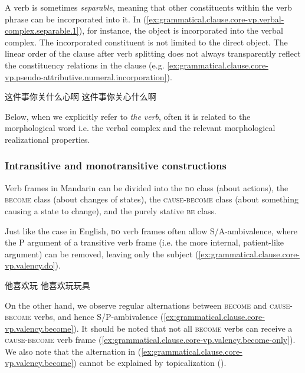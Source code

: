 \documentclass[UTF8, a4paper, oneside, scheme=plain, 12pt]{ctexrep}
\newcommand*{\term}[1]{\emph{#1}}
\newcommand*{\category}[1]{\textsc{#1}}
\begin{document}
A verb is sometimes \emph{separable},
meaning that other constituents within the verb phrase can be incorporated into it.
In (\ref{ex:grammatical.clause.core-vp.verbal-complex.separable.1}),
for instance, the object is incorporated into the verbal complex.
The incorporated constituent is not limited to the direct object.
The linear order of the clause after verb splitting
does not always transparently reflect the constituency relations in the clause
(e.g. \ref{ex:grammatical.clause.core-vp.pseudo-attributive.numeral.incorporation}).

\begin{exe}
    \ex\label{ex:grammatical.clause.core-vp.verbal-complex.separable.1} \begin{xlist}
        \ex 这件事你关什么心啊
        \ex 这件事你关心什么啊
    \end{xlist}
\end{exe}
 
Below, when we explicitly refer to \term{the verb},
often it is related to the morphological word i.e. the verbal complex
and the relevant morphological realizational properties.

\subsubsection{Intransitive and monotransitive constructions}\label{sec:grammatical.clause.core-vp.transitivity}

Verb frames in Mandarin can be divided into the \category{do} class (about actions),
the \category{become} class (about changes of states),
the \category{cause}-\category{become} class (about something causing a state to change),
and the purely stative \category{be} class.

Just like the case in English, \category{do} verb frames often allow S/A-ambivalence,
where the P argument of a transitive verb frame (i.e. the more internal, patient-like argument) can be removed, leaving only the subject (\ref{ex:grammatical.clause.core-vp.valency.do}).

\begin{exe}
    \ex\label{ex:grammatical.clause.core-vp.valency.do} \begin{xlist}
        \ex 他喜欢玩
        \ex 他喜欢玩玩具
    \end{xlist}
\end{exe}

On the other hand, we observe regular alternations between \category{become} and \category{cause}-\category{become} verbs,
and hence S/P-ambivalence (\ref{ex:grammatical.clause.core-vp.valency.become}).
It should be noted that not all \category{become} verbs can receive a \category{cause}-\category{become} verb frame (\ref{ex:grammatical.clause.core-vp.valency.become-only}).
We also note that the alternation in (\ref{ex:grammatical.clause.core-vp.valency.become})
cannot be explained by topicalization ().
\end{document}
